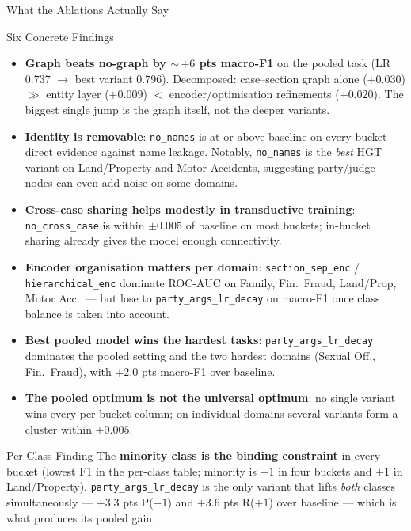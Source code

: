 \documentclass[aspectratio=169,11pt]{beamer}
\newenvironment{tightitemize}{
  \begin{itemize}
    \setlength{\itemsep}{2pt}
    \setlength{\parskip}{0pt}
}{\end{itemize}}
\newcommand{\highlight}[1]{\textcolor{ThesisBlue}{\textbf{#1}}}
\begin{document}
\begin{frame}{What the Ablations Actually Say}
  \tiny
  \begin{block}{Six Concrete Findings}
    \begin{tightitemize}
      \item \highlight{Graph beats no-graph by $\sim$\,$+6$ pts macro-F1} on the pooled task (LR 0.737 $\rightarrow$ best variant 0.796). Decomposed: case--section graph alone ($+0.030$) $\gg$ entity layer ($+0.009$) $<$ encoder/optimisation refinements ($+0.020$). The biggest single jump is the graph itself, not the deeper variants.
      \item \highlight{Identity is removable}: \texttt{no\_names} is at or above baseline on every bucket --- direct evidence against name leakage. Notably, \texttt{no\_names} is the \emph{best} HGT variant on Land/Property and Motor Accidents, suggesting party/judge nodes can even add noise on some domains.
      \item \highlight{Cross-case sharing helps modestly in transductive training}: \texttt{no\_cross\_case} is within $\pm 0.005$ of baseline on most buckets; in-bucket sharing already gives the model enough connectivity.
      \item \highlight{Encoder organisation matters per domain}: \texttt{section\_sep\_enc} / \texttt{hierarchical\_enc} dominate ROC-AUC on Family, Fin.\ Fraud, Land/Prop, Motor Acc.\ --- but lose to \texttt{party\_args\_lr\_decay} on macro-F1 once class balance is taken into account.
      \item \highlight{Best pooled model wins the hardest tasks}: \texttt{party\_args\_lr\_decay} dominates the pooled setting and the two hardest domains (Sexual Off., Fin.\ Fraud), with $+2.0$ pts macro-F1 over baseline.
      \item \highlight{The pooled optimum is not the universal optimum}: no single variant wins every per-bucket column; on individual domains several variants form a cluster within $\pm 0.005$.
    \end{tightitemize}
  \end{block}
  \begin{block}{Per-Class Finding}
    The \highlight{minority class is the binding constraint} in every bucket (lowest F1 in the per-class table; minority is $-1$ in four buckets and $+1$ in Land/Property). \texttt{party\_args\_lr\_decay} is the only variant that lifts \emph{both} classes simultaneously --- $+3.3$ pts P($-1$) and $+3.6$ pts R($+1$) over baseline --- which is what produces its pooled gain.
  \end{block}
\end{frame}
\end{document}
